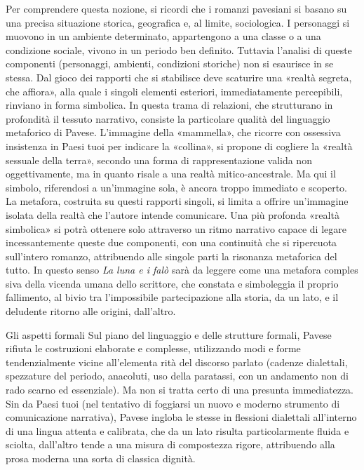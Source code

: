 Per comprendere questa nozione, si ricordi che i romanzi pavesiani si basano su una precisa situazione storica, geografica e, al limite, sociologica. I personaggi si muovono in un ambiente determinato, appartengono a una classe o a una condizione sociale, vivono in un periodo ben definito. Tuttavia l'analisi di queste componenti (personaggi, ambienti, condizioni storiche) non si esaurisce in se stessa. Dal gioco dei rapporti che si stabilisce deve scaturire una «realtà segreta, che affiora», alla quale i singoli elementi esteriori, immediatamente percepibili, rinviano in forma simbolica. In questa trama di relazioni, che strutturano in profondità il tessuto narrativo, consiste la particolare qualità del linguaggio metaforico di Pavese. L'immagine della «mammella», che ricorre con ossessiva insistenza in Paesi tuoi per indicare la «collina», si propone di cogliere la «realtà sessuale della terra», secondo una forma di rappresentazione valida non oggettivamente, ma in quanto risale a una realtà mitico-ancestrale. Ma qui il simbolo, riferendosi a un'immagine sola, è ancora troppo immediato e scoperto. La metafora, costruita su questi rapporti singoli, si limita a offrire un'immagine isolata della realtà che l'autore intende comunicare. Una più profonda «realtà simbolica» si potrà ottenere solo attraverso un ritmo narrativo capace di legare incessantemente queste due componenti, con una continuità che si ripercuota sull'intero romanzo, attribuendo alle singole parti la risonanza metaforica del tutto. In questo senso \textit{La luna e i falò} sarà da leggere come una metafora comples siva della vicenda umana dello scrittore, che constata e simboleggia il proprio fallimento, al bivio tra l'impossibile partecipazione alla storia, da un lato, e il deludente ritorno alle origini, dall'altro.

Gli aspetti formali Sul piano del linguaggio e delle strutture formali, Pavese rifiuta le costruzioni elaborate e complesse, utilizzando modi e forme tendenzialmente vicine all'elementa rità del discorso parlato (cadenze dialettali, spezzature del periodo, anacoluti, uso della paratassi, con un andamento non di rado scarno ed essenziale). Ma non si tratta certo di una presunta immediatezza. Sin da Paesi tuoi (nel tentativo di foggiarsi un nuovo e moderno strumento di comunicazione narrativa), Pavese ingloba le stesse in flessioni dialettali all'interno di una lingua attenta e calibrata, che da un lato risulta particolarmente fluida e sciolta, dall'altro tende a una misura di compostezza rigore, attribuendo alla prosa moderna una sorta di classica dignità.

